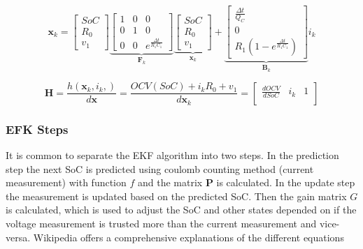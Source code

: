 \begin{equation}
 \boldsymbol x_k = 
  \begin{bmatrix}
  SoC \\
  R_0 \\
  v_1
  \end{bmatrix}   
 \underbrace{  
 \begin{bmatrix}
 1 & 0 & 0\\
 0 & 1 & 0\\
 0 & 0 & e^\frac{\Delta t}{R_1 C_1}
 \end{bmatrix}}_{\boldsymbol F_k}
 \underbrace{ 
 \begin{bmatrix}
 SoC \\
 R_0 \\
 v_1
 \end{bmatrix}}_{\boldsymbol x_k}  
 +
 \underbrace{
 \begin{bmatrix}
 \frac{\Delta t}{Q_C} \\
 0 \\
 R_1 (1-e^\frac{\Delta t}{R_1 C_1})
 \end{bmatrix}}_{\boldsymbol B_k}  i_k  
\end{equation}

\begin{equation}
\boldsymbol H = \frac{h({\boldsymbol {x}}_{k}, {i}_{k},)} {d \boldsymbol {x}}  =  \frac{OCV(SoC) + i_k R_0  +  v_1}{d\boldsymbol {x}_{k}} = 
\begin{bmatrix}
 \frac{dOCV}{dSoC} &  i_k  & 1\\
\end{bmatrix}
\end{equation}

\subsubsection{EFK Steps}

It is common to separate the EKF algorithm into two steps. In the prediction step the next SoC is predicted using coulomb counting method (current measurement) with function $f$ and the %
matrix $\boldsymbol P$ is calculated. In the update step the %
measurement is updated based on the predicted SoC. Then the gain matrix $G$ is calculated, which is used to adjust the SoC and other states depended on if the voltage measurement is trusted more than the current measurement and vice-versa. Wikipedia %
offers a comprehensive explanations of the different equations \\

